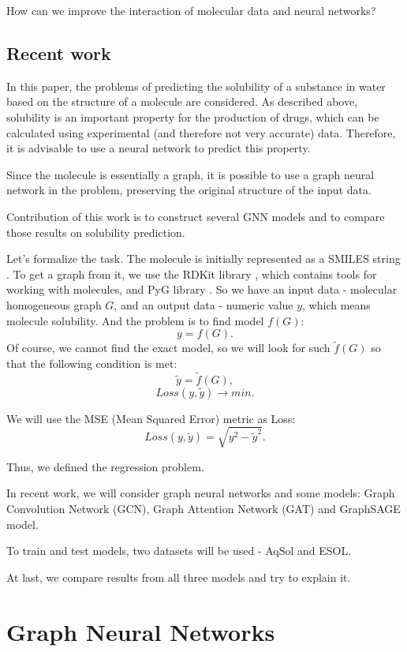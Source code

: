 \documentclass[a4paper,14pt]{article}
\begin{document}
How can we improve the interaction of molecular data and neural networks?

\subsection{Recent work}
In this paper, the problems of predicting the solubility of a substance in water based on the structure of a molecule are considered. As described above, solubility is an important property for the production of drugs, which can be calculated using experimental (and therefore not very accurate) data. Therefore, it is advisable to use a neural network to predict this property.

Since the molecule is essentially a graph, it is possible to use a graph neural network in the problem, preserving the original structure of the input data.

Contribution of this work is to construct several GNN models and to compare those results on solubility prediction.

Let's formalize the task. The molecule is initially represented as a SMILES string \cite{SMILES}. To get a graph from it, we use the RDKit library \cite{RDKIT}, which contains tools for working with molecules, and PyG library \cite{PyG}. So we have an input data - molecular homogeneous graph $G$, and an output data - numeric value $y$, which means molecule solubility. And the problem is to find model $f(G)$:
\begin{equation}
    y = f(G).
\end{equation}
Of course, we cannot find the exact model, so we will look for such $\tilde f(G)$ so that the following condition is met:
$$
    \tilde y = \tilde f(G),
$$
$$
    Loss(y, \tilde y) \to min.
$$

We will use the MSE (Mean Squared Error) metric as Loss:
$$
    Loss(y, \tilde y) = \sqrt{y^2 -  \tilde y^2}.
$$

Thus, we defined the regression problem. 

In recent work, we will consider graph neural networks and some models: Graph Convolution Network (GCN), Graph Attention Network (GAT) and GraphSAGE model. 

To train and test models, two datasets will be used - AqSol and ESOL. 

At last, we compare results from all three models and try to explain it.
\section{Graph Neural Networks}\label{3}
\end{document}
